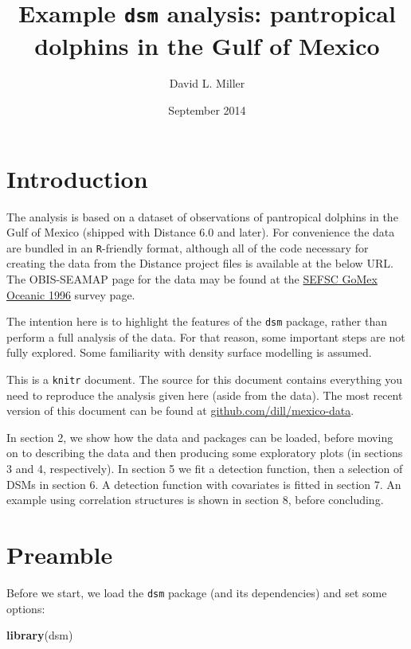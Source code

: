 \documentclass[]{article}
\title{Example \texttt{dsm} analysis: pantropical dolphins in the Gulf of
Mexico}
\author{David L. Miller}
\date{September 2014}
\newenvironment{Shaded}{}{}
\newcommand{\KeywordTok}[1]{\textcolor[rgb]{0.00,0.44,0.13}{\textbf{{#1}}}}
\newcommand{\NormalTok}[1]{{#1}}
\begin{document}
\maketitle

\section{Introduction}\label{introduction}

The analysis is based on a dataset of observations of pantropical
dolphins in the Gulf of Mexico (shipped with Distance 6.0 and later).
For convenience the data are bundled in an \texttt{R}-friendly format,
although all of the code necessary for creating the data from the
Distance project files is available at the below URL. The OBIS-SEAMAP
page for the data may be found at the
\href{http://seamap.env.duke.edu/dataset/25}{SEFSC GoMex Oceanic 1996}
survey page.

The intention here is to highlight the features of the \texttt{dsm}
package, rather than perform a full analysis of the data. For that
reason, some important steps are not fully explored. Some familiarity
with density surface modelling is assumed.

This is a \texttt{knitr} document. The source for this document contains
everything you need to reproduce the analysis given here (aside from the
data). The most recent version of this document can be found at
\href{http://github.com/dill/mexico-data}{github.com/dill/mexico-data}.

In section 2, we show how the data and packages can be loaded, before
moving on to describing the data and then producing some exploratory
plots (in sections 3 and 4, respectively). In section 5 we fit a
detection function, then a selection of DSMs in section 6. A detection
function with covariates is fitted in section 7. An example using
correlation structures is shown in section 8, before concluding.

\section{Preamble}\label{preamble}

Before we start, we load the \texttt{dsm} package (and its dependencies)
and set some options:

\begin{Shaded}
\begin{Highlighting}[]
\KeywordTok{library}\NormalTok{(dsm)}
\end{Highlighting}
\end{Shaded}
\end{document}
